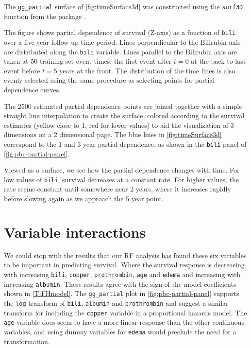 \documentclass[article]{jss}
\begin{document}
The \texttt{gg\_partial} surface of \autoref{fig:timeSurface3d} was
constructed using the \texttt{surf3D} function from the 
package
\citep[\url{http://CRAN.R-project.org/package=plot3D}]{plot3D:2014}.

The figure shows partial dependence of survival (Z-axis) as a function
of \texttt{bili} over a five year follow up time period. Lines
perpendicular to the Bilirubin axis are distributed along the
\texttt{bili} variable. Lines parallel to the Bilirubin axis are taken
at 50 training set event times, the first event after \(t=0\) at the
back to last event before \(t=5\) years at the front. The distribution
of the time lines is also evenly selected using the same procedure as
selecting points for partial dependence curves.

The 2500 estimated partial dependence points are joined together with a
simple straight line interpolation to create the surface, colored
according to the survival estimates (yellow close to 1, red for lower
values) to aid the visualization of 3 dimensions on a 2 dimensional
page. The blue lines in \autoref{fig:timeSurface3d} correspond to the 1
and 3 year partial dependence, as shown in the \texttt{bili} panel of
\autoref{fig:pbc-partial-panel}.

Viewed as a surface, we see how the partial dependence changes with
time. For low values of \texttt{bili}, survival decreases at a constant
rate. For higher values, the rate seems constant until somewhere near 2
years, where it increases rapidly before slowing again as we approach
the 5 year point.

\section{Variable interactions}\label{variable-interactions}

We could stop with the results that our RF analysis has found these six
variables to be important in predicting survival. Where the survival
response is decreasing with increasing \texttt{bili}, \texttt{copper},
\texttt{prothrombin}, \texttt{age} and \texttt{edema} and increasing
with increasing \texttt{albumin}. These results agree with the sign of
the \cite{fleming:1991} model coefficients shown in \autoref{T:FHmodel}.
The \texttt{gg\_partial} plot in \autoref{fig:pbc-partial-panel}
supports the \texttt{log} transform of \texttt{bili}, \texttt{albumin}
and \texttt{prothrombin} and suggest a similar transform for including
the \texttt{copper} variable in a proportional hazards model. The
\texttt{age} variable does seem to have a more linear response than the
other continuous variables, and using dummy variables for \texttt{edema}
would preclude the need for a transformation.
\end{document}
